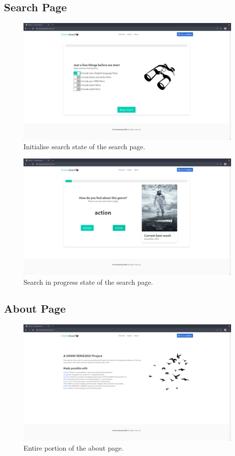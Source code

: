 \documentclass{article}
\begin{document}
\subsection{Search Page}
\begin{figure}[H]
\includegraphics[width=\columnwidth]{res/search_1.png}
\caption{Initialise search state of the search page.}
\end{figure}
\begin{figure}[H]
\includegraphics[width=\columnwidth]{res/search_2.png}
\caption{Search in progress state of the search page.}
\end{figure}
\subsection{About Page}
\begin{figure}[H]
\includegraphics[width=\columnwidth]{res/about.png}
\caption{Entire portion of the about page.}
\end{figure}
\end{document}
